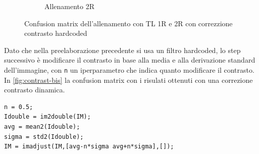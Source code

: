 \begin{figure}[ht]
\begin{subfigure}{0.45\textwidth}
        \caption{Allenamento 2R} 
    \end{subfigure}
    \caption{Confusion matrix dell'allenamento con TL 1R e 2R con correzzione contrasto hardcoded}
    \label{fig:contrast}
\end{figure}

Dato che nella preelaborazione precedente si usa un filtro hardcoded, lo step successivo è modificare il  contrasto in base alla media e alla derivazione standard dell'immagine, con \lstinline{n} un iperparametro che indica quanto modificare il contrasto. In \cref{fig:contrast-bis}  la confusion matrix con i risulati ottenuti con una correzione contrasto dinamica.
\begin{lstlisting}
n = 0.5;  
Idouble = im2double(IM); 
avg = mean2(Idouble);
sigma = std2(Idouble);
IM = imadjust(IM,[avg-n*sigma avg+n*sigma],[]);
\end{lstlisting}

